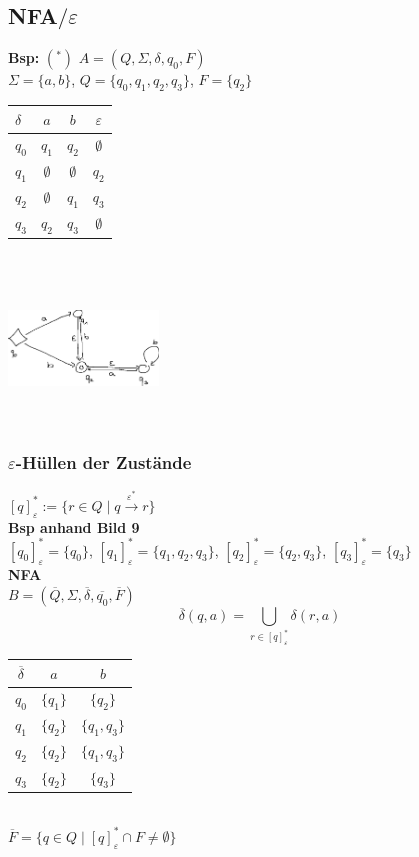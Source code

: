 \documentclass[a4paper,10pt,landscape,twocolumn]{article}
\newcommand{\Bold}[1]{\textbf{#1}} %
\newcommand{\Oben}[2]{\overset{#1}{#2}} %
\begin{document}
\subsection{NFA$/\varepsilon$}
\Bold{Bsp:} $(^*)$ $A=(Q,\Sigma,\delta,q_0,F)$\\
$\Sigma=\{a,b\}$, $Q=\{q_0,q_1,q_2,q_3\}$, $F=\{q_2\}$\\
\begin{tabular}{l|c|c|c}
 ${\delta}$&$a$&$b$&$\varepsilon$\\\hline
 $q_0$&$q_1$&$q_2$&$\emptyset$\\
 $q_1$&$\emptyset$&$\emptyset$&$q_2$\\
 $q_2$&$\emptyset$&$q_1$&$q_3$\\
 $q_3$&$q_2$&$q_3$&$\emptyset$
\end{tabular}\\
\includegraphics[width=0.3\textwidth,height=4cm,keepaspectratio]{Bild9.eps}\\
\subsubsection{$\varepsilon$-H\"ullen der Zust\"ande}
$[q]_\varepsilon^*:=\{r\in Q\mid q\Oben{\varepsilon^*}{\to}r\}$\\
\Bold{Bsp anhand Bild 9}\\
$[q_0]_\varepsilon^*=\{q_0\}$, $[q_1]_\varepsilon^*=\{q_1,q_2,q_3\}$, $[q_2]_\varepsilon^*=\{q_2,q_3\}$, $[q_3]_\varepsilon^*=\{q_3\}$\\
\Bold{NFA}\\
$B=(\overline{Q},\Sigma,\overline{\delta},\overline{q_0},\overline{F})$\\
\begin{equation} 
 \overline{\delta}(q,a)=\bigcup_{r\in[q]_\varepsilon^*}\delta(r,a)
\end{equation}

\begin{tabular}{c|c|c}
 $\overline{\delta}$&$a$&$b$\\\hline
 $q_0$&$\{q_1\}$&$\{q_2\}$\\
 $q_1$&$\{q_2\}$&$\{q_1,q_3\}$\\
 $q_2$&$\{q_2\}$&$\{q_1,q_3\}$\\
 $q_3$&$\{q_2\}$&$\{q_3\}$
\end{tabular}\\
$\overline{F}=\{q\in Q\mid [q]_\varepsilon^*\cap F\neq \emptyset\}$
\end{document}
